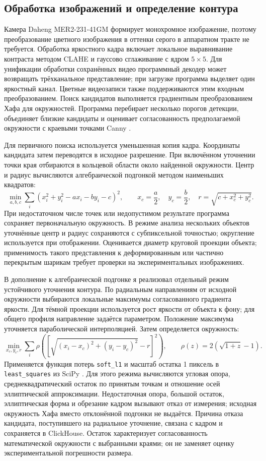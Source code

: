 \documentclass[12pt,a4paper]{article}
\begin{document}
\subsection{Обработка изображений и определение контура}
Камера Daheng MER2-231-41GM формирует монохромное изображение, поэтому преобразование цветного изображения в оттенки серого в аппаратном тракте не требуется. Обработка яркостного кадра включает локальное выравнивание контраста методом CLAHE и гауссово сглаживание с ядром $5\times5$. Для унификации обработки сохранённых видео программный декодер может возвращать трёхканальное представление; при загрузке программа выделяет один яркостный канал. Цветные видеозаписи также поддерживаются этим входным преобразованием. Поиск кандидатов выполняется градиентным преобразованием Хафа для окружностей. Программа перебирает несколько порогов детекции, объединяет близкие кандидаты и оценивает согласованность предполагаемой окружности с краевыми точками Canny \cite{code}.

Для первичного поиска используется уменьшенная копия кадра. Координаты кандидата затем переводятся в исходное разрешение. При включённом уточнении точки края отбираются в кольцевой области около найденной окружности. Центр и радиус вычисляются алгебраической подгонкой методом наименьших квадратов:
\[
\min_{a,b,c}\sum_i\left(x_i^2+y_i^2-a x_i-b y_i-c\right)^2,
\qquad x_c=\frac a2,\quad y_c=\frac b2,\quad
r=\sqrt{c+x_c^2+y_c^2}.
\]
При недостаточном числе точек или недопустимом результате программа сохраняет первоначальную окружность. В режиме анализа нескольких объектов уточнённые центр и радиус сохраняются с субпиксельной точностью; округление используется при отображении. Оценивается диаметр круговой проекции объекта; применимость такого представления к деформированным или частично перекрытым шарикам требует проверки на экспериментальных изображениях.

В дополнение к алгебраической подгонке я реализовал отдельный режим устойчивого уточнения контура. По радиальным направлениям от исходной окружности выбираются локальные максимумы согласованного градиента яркости. Для тёмной проекции используется рост яркости от объекта к фону; для общего профиля направление задаётся параметром. Положение максимума уточняется параболической интерполяцией. Затем определяется окружность:
\[
 \min_{x_c,y_c,r}\sum_i \rho\!\left(\left[\sqrt{(x_i-x_c)^2+(y_i-y_c)^2}-r\right]^2\right),
 \qquad \rho(z)=2(\sqrt{1+z}-1).
\]
Применяется функция потерь \texttt{soft\_l1} и масштаб остатка 1 пиксель в \texttt{least\_squares} из SciPy \cite{scipyfit,code}. Для этого режима вычисляются угловая опора, среднеквадратический остаток по принятым точкам и отношение осей эллиптической аппроксимации. Недостаточная опора, большой остаток, эллиптическая форма и обрезание кадром вызывают отказ от измерения; исходная окружность Хафа вместо отклонённой подгонки не выдаётся. Причина отказа кандидата, поступившего на радиальное уточнение, связана с кадром и сохраняется в ClickHouse. Остаток характеризует согласованность математической окружности с выбранными краями; он не заменяет оценку экспериментальной погрешности размера.
\end{document}
